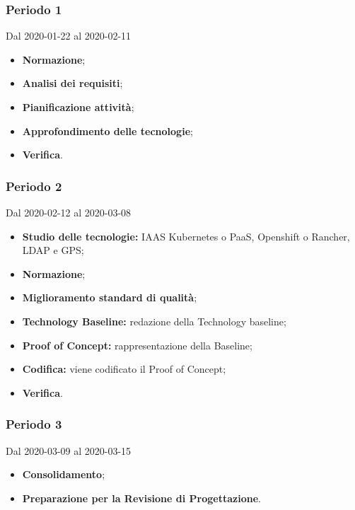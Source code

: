 \subsubsection{Periodo 1} 
Dal 2020-01-22 al 2020-02-11
\begin{itemize}
	\item \textbf{Normazione};
	\item \textbf{Analisi dei requisiti};
	\item \textbf{Pianificazione attività};
	\item \textbf{Approfondimento delle tecnologie};
	\item \textbf{Verifica}.
\end{itemize}
\subsubsection{Periodo 2} 
Dal 2020-02-12 al 2020-03-08
\begin{itemize}
	\item \textbf{Studio delle tecnologie:} IAAS Kubernetes o PaaS, Openshift o Rancher, LDAP e GPS;
	\item \textbf{Normazione};
	\item \textbf{Miglioramento standard di qualità};
	\item \textbf{Technology Baseline:} redazione della Technology baseline;
	\item \textbf{Proof of Concept:} rappresentazione della Baseline;
	\item \textbf{Codifica:} viene codificato il Proof of Concept;
	\item \textbf{Verifica}.
\end{itemize}
\subsubsection{Periodo 3} 
Dal 2020-03-09 al 2020-03-15
\begin{itemize}
	\item \textbf{Consolidamento};
	\item \textbf{Preparazione per la Revisione di Progettazione}.
\end{itemize}

